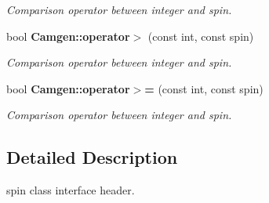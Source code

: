\begin{DoxyCompactItemize}
\begin{DoxyCompactList}\small\item\em Comparison operator between integer and spin. \end{DoxyCompactList}\item 
\hypertarget{a00849_a1785655e592a67a21af31d0d8d58d635}{bool {\bfseries Camgen\-::operator$>$} (const int, const spin)}\label{a00849_a1785655e592a67a21af31d0d8d58d635}

\begin{DoxyCompactList}\small\item\em Comparison operator between integer and spin. \end{DoxyCompactList}\item 
\hypertarget{a00849_ad1b6d03e18af7cc21fe03a5083320d4a}{bool {\bfseries Camgen\-::operator$>$=} (const int, const spin)}\label{a00849_ad1b6d03e18af7cc21fe03a5083320d4a}

\begin{DoxyCompactList}\small\item\em Comparison operator between integer and spin. \end{DoxyCompactList}\end{DoxyCompactItemize}


\subsection{Detailed Description}
spin class interface header. 